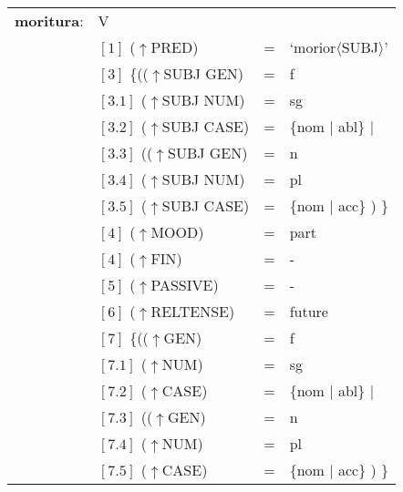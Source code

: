 \documentclass[12pt,a4paper]{article}
\begin{document}
\begin{singlespace}
\begin{tabular}{ l  l  l  l  } 
\textbf{moritura}: & V \\
$\qquad$ & $[1]$ \:  ($\uparrow$PRED) & = & `morior$\langle$SUBJ$\rangle$'\\
$\qquad$ & $[3]$ \:  \{(($\uparrow$SUBJ GEN) & = & f \\ 
$\qquad$ & $[3.1]$ \:  ($\uparrow$SUBJ NUM) & = & sg \\
$\qquad$ & $[3.2]$ \:  ($\uparrow$SUBJ CASE) & = & \{nom $\mid$ abl\} $\mid$\\
$\qquad$ & $[3.3]$ \: (($\uparrow$SUBJ GEN) & = & n \\
$\qquad$ & $[3.4]$ \:  ($\uparrow$SUBJ NUM) & = & pl \\
$\qquad$ & $[3.5]$ \:  ($\uparrow$SUBJ CASE) & = & \{nom $\mid$ acc\} ) \}\\
$\qquad$ & $[4]$ \:  ($\uparrow$MOOD) & = & part\\
$\qquad$ & $[4]$ \:  ($\uparrow$FIN) & = & - \\
$\qquad$ & $[5]$ \:  ($\uparrow$PASSIVE) & = & - \\
$\qquad$ & $[6]$ \:  ($\uparrow$RELTENSE) & = & future \\
$\qquad$ & $[7]$ \:  \{(($\uparrow$GEN) & = & f \\ 
$\qquad$ & $[7.1]$ \:  ($\uparrow$NUM) & = & sg \\
$\qquad$ & $[7.2]$ \:  ($\uparrow$CASE) & = & \{nom $\mid$ abl\} $\mid$\\
$\qquad$ & $[7.3]$ \: (($\uparrow$GEN) & = & n \\
$\qquad$ & $[7.4]$ \:  ($\uparrow$NUM) & = & pl \\
$\qquad$ & $[7.5]$ \:  ($\uparrow$CASE) & = & \{nom $\mid$ acc\} ) \}\\
\end{tabular}
\newline
\newline
\end{singlespace}
\end{document}
